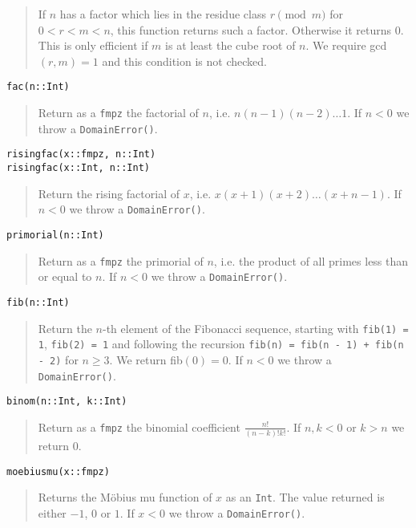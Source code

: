 \documentclass[a4paper,10pt]{article}
\newcommand{\code}{\lstinline}
\newcommand{\desc}[1]{\vspace{-3mm}\begin{quote}#1\end{quote}}
\begin{document}
{{\desc{If $n$ has a factor which lies in the residue class $r \pmod{m}$ for $0 < r < m < n$,
this function returns such a factor. Otherwise it returns $0$. This is only efficient if 
$m$ is at least the cube root of $n$. We require gcd$(r, m) = 1$ and this condition is not
checked.}

\begin{lstlisting}
fac(n::Int)
\end{lstlisting}

\desc{Return as a \code{fmpz} the factorial of $n$, i.e. $n(n - 1)(n - 2)\ldots 1$.
If $n < 0$ we throw a \code{DomainError()}.}

\begin{lstlisting}
risingfac(x::fmpz, n::Int)
risingfac(x::Int, n::Int)
\end{lstlisting}

\desc{Return the rising factorial of $x$, i.e. $x(x + 1)(x + 2)\ldots (x + n - 1)$.
If $n < 0$ we throw a \code{DomainError()}.}

\begin{lstlisting}
primorial(n::Int)
\end{lstlisting}

\desc{Return as a \code{fmpz} the primorial of $n$, i.e. the product of all primes
less than or equal to $n$. If $n < 0$ we throw a \code{DomainError()}.}

\begin{lstlisting}
fib(n::Int)
\end{lstlisting}

\desc{Return the $n$-th element of the Fibonacci sequence, starting with 
\code{fib(1) = 1}, \code{fib(2) = 1} and following the recursion 
\code{fib(n) = fib(n - 1) + fib(n - 2)} for $n \geq 3$.
We return fib$(0) = 0$. If $n < 0$ we throw a \code{DomainError()}.}

\begin{lstlisting}
binom(n::Int, k::Int)
\end{lstlisting}

\desc{Return as a \code{fmpz} the binomial coefficient $\frac{n!}{(n - k)!k!}$. If
$n, k < 0$ or $k > n$ we return $0$.}

\begin{lstlisting}
moebiusmu(x::fmpz)
\end{lstlisting}

\desc{Returns the M\"{o}bius mu function of $x$ as an \code{Int}. The value returned is
either $-1$, $0$ or $1$. If $x < 0$ we throw a \code{DomainError()}.}

}}
\end{document}
